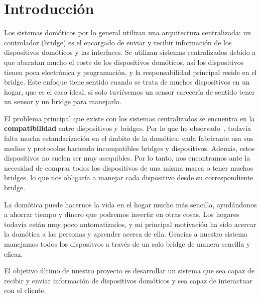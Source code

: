 \chapter{Introducción} 
\label{chap:intro}

\vspace{-0.2cm}


Los sistemas domóticos por lo general utilizan una arquitectura centralizada: un controlador (bridge) es el encargado de enviar y recibir información de los dispositivos domóticos y las interfaces.
 Se utilizan sistemas centralizados debido a que abaratan mucho el coste de los dispositivos domóticos, así los dispositivos tienen poca electrónica y programación, y la responsabilidad principal
 reside en el bridge. Este enfoque tiene sentido cuando se trata de muchos dispositivos en un hogar, que es el caso ideal, si solo tuviésemos un sensor carecería de sentido tener un sensor y un bridge para manejarlo.

El problema principal que existe con los sistemas centralizados se encuentra en la \textbf{compatibilidad} entre dispositivos y bridges.
Por lo que he observado~\cite{article:EstadoDelArte}, todavía falta mucha estandarización en el
ámbito de la domótica: cada fabricante usa sus medios y protocolos haciendo incompatibles bridges y dispositivos. Además, estos dispositivos no suelen ser 
muy asequibles. Por lo tanto, nos encontramos ante la necesidad de comprar todos los dispositivos de una misma marca o tener muchos bridges, lo que nos obligaría a manejar cada
dispositivo desde su correspondiente bridge.

La domótica puede hacernos la vida en el hogar mucho más sencilla, ayudándonos a ahorrar tiempo y dinero que podremos invertir en otras cosas. Los hogares todavía están muy poco automatizados, y mi principal motivación ha sido acercar la domótica 
a las personas y aprender acerca de ella. Gracias a nuestro sistema manejamos todos los dispositvos a través de un solo bridge de manera sencilla y eficaz.

\newpage
{}

El objetivo último de nuestro proyecto es desarrollar un sistema que sea capaz de recibir y enviar información de dispositivos domóticos y sea capaz de interactuar con el cliente. 

